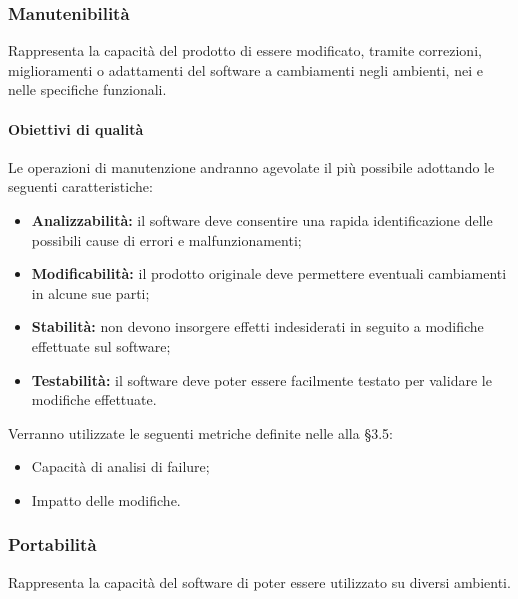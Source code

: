 \documentclass[PianoDiQualifica.tex]{subfiles}
\begin{document}
\subsubsection{Manutenibilità}
Rappresenta la capacità del prodotto di essere modificato, tramite correzioni, miglioramenti o adattamenti del software a cambiamenti negli ambienti, nei  e nelle specifiche funzionali.
\paragraph{Obiettivi di qualità}
Le operazioni di manutenzione andranno agevolate il più possibile adottando le seguenti caratteristiche:
\begin{itemize}
	\item \textbf{Analizzabilità:} il software deve consentire una rapida identificazione delle possibili cause di errori e malfunzionamenti;
	\item \textbf{Modificabilità:} il prodotto originale deve permettere eventuali cambiamenti in alcune sue parti;
	\item \textbf{Stabilità:} non devono insorgere effetti indesiderati in seguito a modifiche effettuate sul software;
	\item \textbf{Testabilità:} il software deve poter essere facilmente testato per validare le modifiche effettuate.
\end{itemize}
Verranno utilizzate le seguenti metriche definite nelle \ndp alla \S{3.5}:
\begin{itemize}
	\item {} Capacità di analisi di failure;
	\item {} Impatto delle modifiche.
\end{itemize}

\subsubsection{Portabilità}
Rappresenta la capacità del software di poter essere utilizzato su diversi ambienti.
\end{document}

